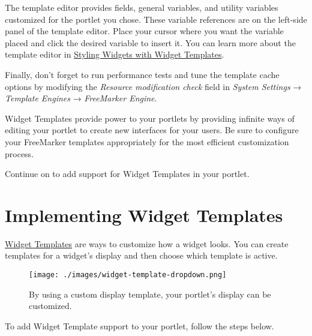 The template editor provides fields, general variables, and utility
variables customized for the portlet you chose. These variable
references are on the left-side panel of the template editor. Place your
cursor where you want the variable placed and click the desired variable
to insert it. You can learn more about the template editor in
\href{/docs/7-2/user/-/knowledge_base/u/styling-widgets-with-widget-templates}{Styling
Widgets with Widget Templates}.

Finally, don't forget to run performance tests and tune the template
cache options by modifying the \emph{Resource modification check} field
in \emph{System Settings} → \emph{Template Engines} → \emph{FreeMarker
Engine}.

Widget Templates provide power to your portlets by providing infinite
ways of editing your portlet to create new interfaces for your users. Be
sure to configure your FreeMarker templates appropriately for the most
efficient customization process.

Continue on to add support for Widget Templates in your portlet.

\chapter{Implementing Widget
Templates}\label{implementing-widget-templates}

\href{/docs/7-2/user/-/knowledge_base/u/styling-widgets-with-widget-templates}{Widget
Templates} are ways to customize how a widget looks. You can create
templates for a widget's display and then choose which template is
active.

\begin{figure}
\centering
\texttt{[image: ./images/widget-template-dropdown.png]}
\caption{By using a custom display template, your portlet's display can
be customized.}
\end{figure}

To add Widget Template support to your portlet, follow the steps below.

